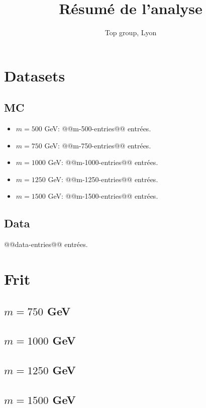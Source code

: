\documentclass[twoside,12pt]{article}
\title{Résumé de l'analyse}
\author{Top group, Lyon}
\begin{document}
\maketitle
\tableofcontents

\newpage


\section{Datasets}

\subsection{MC}

\begin{itemize}
\item $m = 500$ GeV: @@m-500-entries@@ entrées.
\item $m = 750$ GeV: @@m-750-entries@@ entrées.
\item $m = 1000$ GeV: @@m-1000-entries@@ entrées.
\item $m = 1250$ GeV: @@m-1250-entries@@ entrées.
\item $m = 1500$ GeV: @@m-1500-entries@@ entrées.
\end{itemize}

\subsection{Data}

@@data-entries@@ entrées.

\section{Frit}


\subsection{$m = 750$ GeV}


\subsection{$m = 1000$ GeV}


\subsection{$m = 1250$ GeV}


\subsection{$m = 1500$ GeV}

\end{document}

